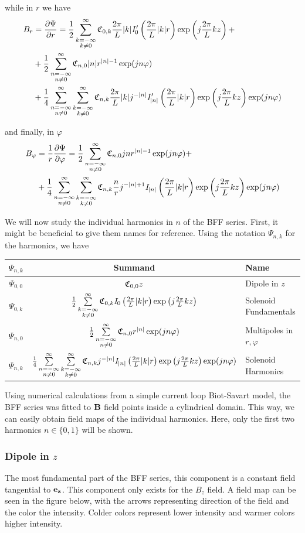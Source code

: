 while in $r$ we have
\begin{equation}
    \begin{split}
        B_r &= \frac{\partial \Psi}{\partial r} =
        \Bffrok + \\ &+ \Bffrno \\ &+\Bffrnk
    \end{split}
\end{equation}

and finally, in $\varphi$
\begin{equation}
    \begin{split}
        B_\varphi &= \frac{1}{r}
        \frac{\partial \Psi}{\partial \varphi} = \Bffpno +\\
        &+ \Bffpnk
    \end{split}
\end{equation}

We will now study the individual harmonics in $n$ of the
BFF series. First, it might be beneficial to give them 
names for reference. Using the notation $\Psi_{n,k}$
for the harmonics, we have

\begin{center}
    \begin{tabular}{c c p{2cm}}
        $\Psi_{n,k}$ & Summand & Name \\ \hline
        $\Psi_{0,0}$ & $\Cnk[0,0]z$ & Dipole in $z$ \\
        $\Psi_{0,k}$ & $\Bffok$ & Solenoid Fundamentals \\
        $\Psi_{n,0}$ & $\Bffno$ & Multipoles in $r, \varphi$ \\
        $\Psi_{n,k}$ & $\Bffnk$ & Solenoid Harmonics
    \end{tabular}
\end{center}

Using numerical calculations from a simple current loop 
Biot-Savart model, the BFF series was fitted to $\vb{B}$
field points inside a cylindrical domain. This way, we
can easily obtain field maps of the individual harmonics.
Here, only the first two harmonics $n\in\{0,1\}$ will be 
shown.

\subsubsection{Dipole in $z$}
The most fundamental part of the BFF series, this component
is a constant field tangential to $\ez$. This component
only exists for the $B_z$ field. A field map can 
be seen in the figure below, with the arrows representing
direction of the field and the color the intensity. Colder
colors represent lower intensity and warmer colors higher
intensity.

